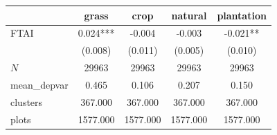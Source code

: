 {
\def\sym#1{\ifmmode^{#1}\else\(^{#1}\)\fi}
\begin{tabular}{l*{4}{c}}
\toprule
          &\multicolumn{1}{c}{grass}&\multicolumn{1}{c}{crop}&\multicolumn{1}{c}{natural}&\multicolumn{1}{c}{plantation}\\
\midrule
FTAI      &    0.024***&   -0.004   &   -0.003   &   -0.021** \\
          &  (0.008)   &  (0.011)   &  (0.005)   &  (0.010)   \\
\midrule
\(N\)     &    29963   &    29963   &    29963   &    29963   \\
mean\_depvar&    0.465   &    0.106   &    0.207   &    0.150   \\
clusters  &  367.000   &  367.000   &  367.000   &  367.000   \\
plots     & 1577.000   & 1577.000   & 1577.000   & 1577.000   \\
\bottomrule
\end{tabular}
}
